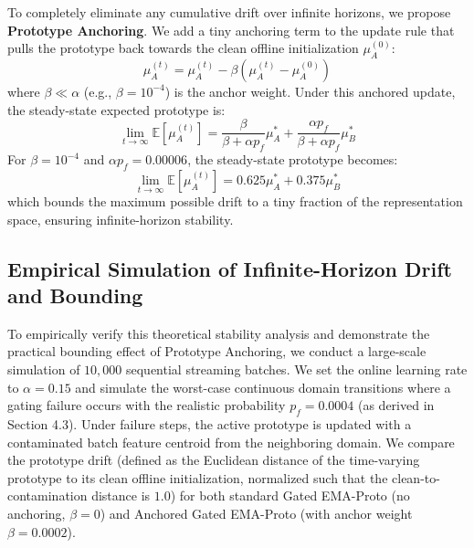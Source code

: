 \documentclass{article}
\theoremstyle{plain}
\theoremstyle{definition}
\theoremstyle{remark}
\begin{document}
To completely eliminate any cumulative drift over infinite horizons, we propose \textbf{Prototype Anchoring}. We add a tiny anchoring term to the update rule that pulls the prototype back towards the clean offline initialization $\mu_A^{(0)}$:
\begin{equation}
    \mu_A^{(t)} = \mu_A^{(t)} - \beta \left(\mu_A^{(t)} - \mu_A^{(0)}\right)
\end{equation}
where $\beta \ll \alpha$ (e.g., $\beta = 10^{-4}$) is the anchor weight. Under this anchored update, the steady-state expected prototype is:
\begin{equation}
    \lim_{t \to \infty} \mathbb{E}[\mu_A^{(t)}] = \frac{\beta}{\beta + \alpha p_f} \mu_A^* + \frac{\alpha p_f}{\beta + \alpha p_f} \mu_B^*
\end{equation}
For $\beta = 10^{-4}$ and $\alpha p_f = 0.00006$, the steady-state prototype becomes:
\begin{equation}
    \lim_{t \to \infty} \mathbb{E}[\mu_A^{(t)}] = 0.625 \mu_A^* + 0.375 \mu_B^*
\end{equation}
which bounds the maximum possible drift to a tiny fraction of the representation space, ensuring infinite-horizon stability.

\subsection{Empirical Simulation of Infinite-Horizon Drift and Bounding}
To empirically verify this theoretical stability analysis and demonstrate the practical bounding effect of Prototype Anchoring, we conduct a large-scale simulation of $10,000$ sequential streaming batches. We set the online learning rate to $\alpha = 0.15$ and simulate the worst-case continuous domain transitions where a gating failure occurs with the realistic probability $p_f = 0.0004$ (as derived in Section 4.3). Under failure steps, the active prototype is updated with a contaminated batch feature centroid from the neighboring domain. We compare the prototype drift (defined as the Euclidean distance of the time-varying prototype to its clean offline initialization, normalized such that the clean-to-contamination distance is $1.0$) for both standard Gated EMA-Proto (no anchoring, $\beta=0$) and Anchored Gated EMA-Proto (with anchor weight $\beta = 0.0002$).
\end{document}
